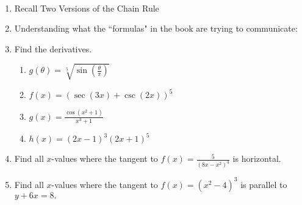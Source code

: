 \documentclass[11pt,fleqn]{article}
\begin{document}
\renewcommand{\headrulewidth}{0pt}
\newcommand{\blank}[1]{\rule{#1}{0.75pt}}
\newcommand{\bc}{\begin{center}}
\newcommand{\ec}{\end{center}}
\renewcommand{\d}{\displaystyle}

\vspace*{-0.7in}

\begin{center}
  \large
  \\
\end{center}
\begin{enumerate}
\item Recall Two Versions of the Chain Rule
\vspace{1in}
\item Understanding what the ``formulas" in the book are trying to communicate:
\vspace{2in}	
\item Find the derivatives.
	\begin{enumerate}
	\item $g(\theta)=\sqrt[5]{\sin(\frac{\theta}{\pi})}$
	\vfill
	\item $f(x)=(\sec(3x)+\csc(2x))^5$
	\vfill
	\item $g(x)=\frac{\cos(x^2+1)}{x^3+1}$
	\vfill
\newpage
	\item $h(x)=(2x-1)^3(2x+1)^5$
	\vfill
	\end{enumerate}

\item Find all $x$-values where the tangent to $f(x)=\frac{5}{(8x-x^2)^3}$ is horizontal.

\vfill

\item Find all $x$-values where the tangent to $f(x)=(x^2-4)^3$ is parallel to $y+6x=8.$
\vfill


\end{enumerate}
\end{document}
